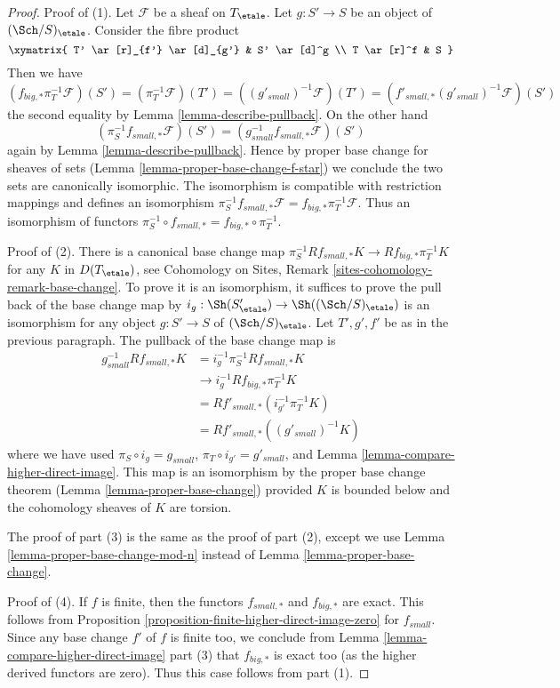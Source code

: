 \begin{proof}
Proof of (1). Let $\mathcal{F}$ be a sheaf on $T_\etale$.
Let $g : S' \to S$ be an object of $(\Sch/S)_\etale$. Consider the
fibre product
$$
\xymatrix{
T' \ar[r]_{f'} \ar[d]_{g'} & S' \ar[d]^g \\
T \ar[r]^f & S
}
$$
Then we have
$$
(f_{big, *}\pi_T^{-1}\mathcal{F})(S') =
(\pi_T^{-1}\mathcal{F})(T') =
((g'_{small})^{-1}\mathcal{F})(T')  =
(f'_{small, *}(g'_{small})^{-1}\mathcal{F})(S')
$$
the second equality by Lemma \ref{lemma-describe-pullback}.
On the other hand
$$
(\pi_S^{-1}f_{small, *}\mathcal{F})(S') =
(g_{small}^{-1}f_{small, *}\mathcal{F})(S')
$$
again by Lemma \ref{lemma-describe-pullback}.
Hence by proper base change for sheaves of sets
(Lemma \ref{lemma-proper-base-change-f-star})
we conclude the two sets are canonically isomorphic.
The isomorphism is compatible with restriction mappings
and defines an isomorphism
$\pi_S^{-1}f_{small, *}\mathcal{F} = f_{big, *}\pi_T^{-1}\mathcal{F}$.
Thus an isomorphism of functors
$\pi_S^{-1} \circ f_{small, *} = f_{big, *} \circ \pi_T^{-1}$.

\medskip\noindent
Proof of (2). There is a canonical base change map
$\pi_S^{-1}Rf_{small, *}K \to Rf_{big, *}\pi_T^{-1}K$
for any $K$ in $D(T_\etale)$, see
Cohomology on Sites, Remark \ref{sites-cohomology-remark-base-change}.
To prove it is an isomorphism, it suffices to prove the pull back of
the base change map by $i_g : \Sh(S'_\etale) \to \Sh((\Sch/S)_\etale)$
is an isomorphism for any object $g : S' \to S$ of $(\Sch/S)_\etale$.
Let $T', g', f'$ be as in the previous paragraph.
The pullback of the base change map is
\begin{align*}
g_{small}^{-1}Rf_{small, *}K
& =
i_g^{-1}\pi_S^{-1}Rf_{small, *}K \\
& \to
i_g^{-1}Rf_{big, *}\pi_T^{-1}K \\
& =
Rf'_{small, *}(i_{g'}^{-1}\pi_T^{-1}K) \\
& =
Rf'_{small, *}((g'_{small})^{-1}K)
\end{align*}
where we have used $\pi_S \circ i_g = g_{small}$,
$\pi_T \circ i_{g'} = g'_{small}$, and
Lemma \ref{lemma-compare-higher-direct-image}.
This map is an isomorphism by the proper base change theorem
(Lemma \ref{lemma-proper-base-change}) provided $K$ is bounded
below and the cohomology sheaves of $K$ are torsion.

\medskip\noindent
The proof of part (3) is the same as the proof of part (2), except
we use Lemma \ref{lemma-proper-base-change-mod-n}
instead of Lemma \ref{lemma-proper-base-change}.

\medskip\noindent
Proof of (4). If $f$ is finite, then the functors
$f_{small, *}$ and $f_{big, *}$ are exact. This follows
from Proposition \ref{proposition-finite-higher-direct-image-zero}
for $f_{small}$. Since any base change $f'$ of $f$ is finite too,
we conclude from Lemma \ref{lemma-compare-higher-direct-image} part (3)
that $f_{big, *}$ is exact too (as the higher derived functors are zero).
Thus this case follows from part (1).
\end{proof}




